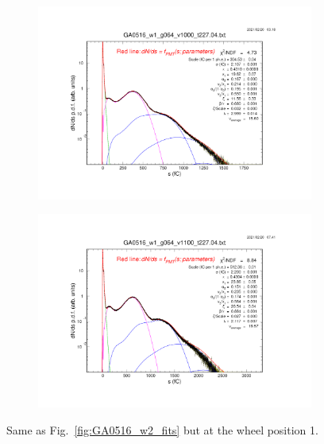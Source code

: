 \begin{figure}[b]
\begin{subfigure}[c]{0.42\linewidth}
		\centering
		\includegraphics[width=\linewidth, trim={6cm 6cm 75mm 85mm},clip]{figures/GA0516_w1_g064_v1000_raw_log.04.png}
		\vspace{0mm}
	\end{subfigure}%
	\begin{subfigure}[c]{0.42\linewidth}
		\centering
		\includegraphics[width=\linewidth, trim={75mm 6cm 6cm 85mm},clip]{figures/GA0516_w1_g064_v1100_raw_log.04.png}
		\vspace{0mm}
	\end{subfigure}%
	\caption{Same as Fig.~\ref{fig:GA0516_w2_fits} but at the wheel position 1.}
	\label{fig:GA0516_w1_fits}
\end{figure}


